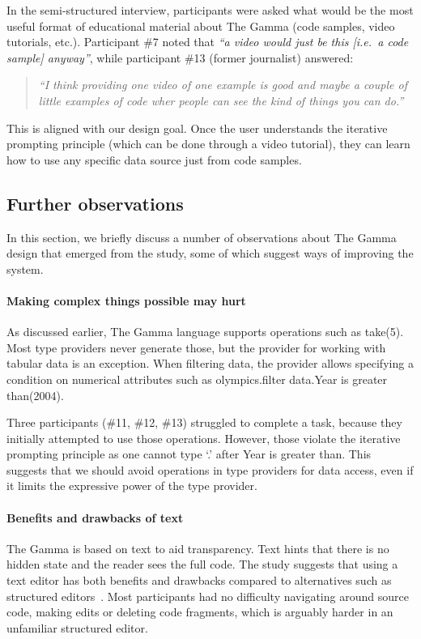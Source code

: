 \documentclass[manuscript,review,anonymous]{acmart}
\newcommand{\ikvd}[1]{{\fontfamily{zi4}\selectfont\small #1}}
\begin{document}
In the semi-structured interview, participants were asked what would be the most useful format
of educational material about The Gamma (code samples, video tutorials, etc.).
Participant \#7 noted that \emph{``a video would just be this [i.e.~a code sample] anyway''}, while
participant \#13 (former journalist) answered:

\begin{quote}
  \emph{``I think providing one video of one example is good and maybe a couple of little examples
  of code wher people can see the kind of things you can do.''}
\end{quote}

This is aligned with our design goal. Once the user understands the iterative prompting principle
(which can be done through a video tutorial), they can learn how to use any specific data source
just from code samples.

\subsection{Further observations}
In this section, we briefly discuss a number of observations about The Gamma design that
emerged from the study, some of which suggest ways of improving the system.

\paragraph{Making complex things possible may hurt}
As discussed earlier, The Gamma language supports operations such as \ikvd{take(5)}. Most type
providers never generate those, but the provider for working with tabular data is an exception.
When filtering data, the provider allows specifying a condition on numerical attributes such as
\ikvd{olympics.\textquotesingle filter data\textquotesingle.\textquotesingle Year is greater than\textquotesingle(2004)}.

Three participants (\#11, \#12, \#13) struggled to complete a task, because they
initially attempted to use those operations. However, those violate the iterative prompting
principle as one cannot type `.' after \ikvd{\textquotesingle Year is greater than\textquotesingle}.
This suggests that we should avoid operations in type providers for data access, even if it
limits the expressive power of the type provider.

\paragraph{Benefits and drawbacks of text}
The Gamma is based on text to aid transparency. Text hints that there is no hidden state and
the reader sees the full code. The study suggests that using a text editor has both
benefits and drawbacks compared to alternatives such as structured editors~\cite{structure-based,livenut,lamdu}.
Most participants had no difficulty navigating around source code, making edits or deleting code
fragments, which is arguably harder in an unfamiliar structured editor.
\end{document}
